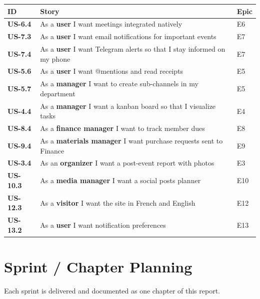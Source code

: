 \documentclass[12pt,a4paper]{report}
\begin{document}
\begin{center}
\begin{tabular}{>{\bfseries}p{1.5cm} p{10cm} p{2.2cm}}
\toprule
\textbf{ID} & \textbf{Story} & \textbf{Epic} \\
\midrule
US-6.4 & As a \textbf{user} I want meetings integrated natively & E6 \\
US-7.3 & As a \textbf{user} I want email notifications for important events & E7 \\
US-7.4 & As a \textbf{user} I want Telegram alerts so that I stay informed on my phone & E7 \\
US-5.6 & As a \textbf{user} I want @mentions and read receipts & E5 \\
US-5.7 & As a \textbf{manager} I want to create sub-channels in my department & E5 \\
US-4.4 & As a \textbf{manager} I want a kanban board so that I visualize tasks & E4 \\
US-8.4 & As a \textbf{finance manager} I want to track member dues & E8 \\
US-9.4 & As a \textbf{materials manager} I want purchase requests sent to Finance & E9 \\
US-3.4 & As an \textbf{organizer} I want a post-event report with photos & E3 \\
US-10.3 & As a \textbf{media manager} I want a social posts planner & E10 \\
US-12.3 & As a \textbf{visitor} I want the site in French and English & E12 \\
US-13.2 & As a \textbf{user} I want notification preferences & E13 \\
\bottomrule
\end{tabular}
\end{center}

\section{Sprint / Chapter Planning}
\label{sec:sprintplan}

Each sprint is delivered and documented as one chapter of this report.
\end{document}
